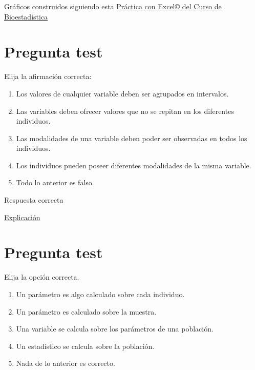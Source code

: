 \documentclass[
]{book}
\providecommand{\tightlist}{%
  \setlength{\itemsep}{0pt}\setlength{\parskip}{0pt}}
\begin{document}
Gráficos construidos siguiendo esta \href{https://1fjmanzano.github.io/bioestadistica/nu\%CC\%81meros-i\%CC\%81ndices.html\#n\%C3\%BAmeros-\%C3\%ADndices-pr\%C3\%A1ctica-con-excel}{Práctica con Excel© del Curso de Bioestadística}

\hypertarget{pregunta-test-16}{%
\section{Pregunta test}\label{pregunta-test-16}}

Elija la afirmación correcta:

\begin{enumerate}
\def\labelenumi{\alph{enumi})}
\tightlist
\item
  Los valores de cualquier variable deben ser agrupados en intervalos.
\item
  Las variables deben ofrecer valores que no se repitan en los diferentes individuos.
\item
  Las modalidades de una variable deben poder ser observadas en todos los individuos.
\item
  Los individuos pueden poseer diferentes modalidades de la misma variable.
\item
  Todo lo anterior es falso.
\end{enumerate}

Respuesta correcta

\href{https://1fjmanzano.github.io/bioestadistica/tipos-de-variables.html}{Explicación}

\hypertarget{pregunta-test-17}{%
\section{Pregunta test}\label{pregunta-test-17}}

Elija la opción correcta.

\begin{enumerate}
\def\labelenumi{\alph{enumi})}
\tightlist
\item
  Un parámetro es algo calculado sobre cada individuo.
\item
  Un parámetro es calculado sobre la muestra.
\item
  Una variable se calcula sobre los parámetros de una población.
\item
  Un estadístico se calcula sobre la población.
\item
  Nada de lo anterior es correcto.
\end{enumerate}
\end{document}
